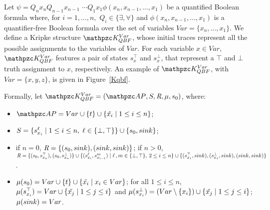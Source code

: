 Let $\psi=Q_n x_n Q_{n-1} x_{n-1}$ $\cdots Q_1 x_1 \phi(x_n,x_{n-1},\ldots ,x_1)$ be a quantified Boolean formula where, for $i=1,\ldots ,n,$ $Q_i\in \{\exists, \forall\}$ and $\phi(x_n,x_{n-1},\ldots ,x_1)$ is a quantifier-free Boolean formula over the set of variables $Var = \{x_n,\ldots ,x_1\}$. We define a Kripke structure $\Ku_{QBF}^{Var}$, whose initial traces represent all the possible assignments to the variables of $Var$. For each variable $x \in Var$, $\Ku_{QBF}^{Var}$ features a pair of states $s_x^{\top}$ and $s_x^{\bot}$, that represent a $\top$ and $\bot$ truth assignment to $x$, respectively. An example of $\Ku_{QBF}^{Var}$, with $Var=\{x,y,z\}$, is given in Figure~\ref{Kqbf}.

Formally, let $\Ku_{QBF}^{Var}=\KuDef$, where:
\begin{itemize}
    \item $\Prop= Var \cup \{t\} \cup \{ \tilde{x_i} \mid 1\leq i\leq n\}$;
    \item $S= \{s_{x_i}^\ell \mid 1\leq i\leq n,\; \ell \in \{\bot,\top\}\} \cup \{s_0,sink\}$;
    \item if $n=0$, $\textit{R}=\{(s_0,sink),(sink,sink)\}$;\newline
            if $n>0$,  
            $\textit{R} = \{(s_0,s_{x_n}^{\top}),(s_0,s_{x_n}^{\bot})\}\cup 
            \{(s_{x_i}^\ell,s_{x_{i-1}}^m) \mid \ell \, , m \in \{\bot,\top\},\: 2 \leq i \leq n\} \cup 
            \{(s_{x_1}^{\top},sink),(s_{x_1}^{\bot},sink),(sink,sink) \}$. 
    \item $\mu(s_0) = Var \cup \{t\}\cup \{ \tilde{x_i} \mid x_i \in Var\}$; \newline
            for all $1\leq i\leq n$, $\mu(s_{x_i}^\top) = Var \cup \{\tilde{x_j} \mid 1\leq j\leq i\}$
            and $\mu(s_{x_i}^\bot) = (Var \setminus \{x_i\}) \cup \{\tilde{x_j} \mid 1\leq j\leq i\}$; \newline
            $\mu(sink) = Var$.
\end{itemize}

